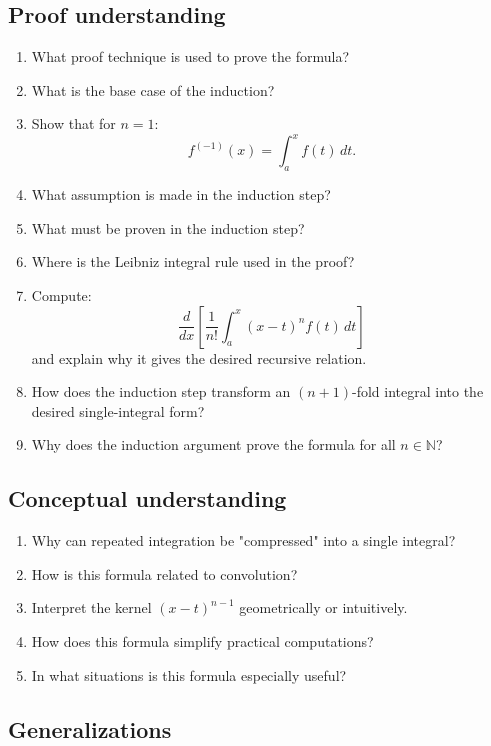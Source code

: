 \subsection{Proof understanding}

\begin{enumerate}[resume]
  \item What proof technique is used to prove the formula?
  \item What is the base case of the induction?
  \item Show that for \(n=1\):
    \[ f^{(-1)}(x) = \int_{a}^{x} f(t)\,dt. \]
  \item What assumption is made in the induction step?
  \item What must be proven in the induction step?
  \item Where is the Leibniz integral rule used in the proof?
  \item Compute:
    \[ \frac{d}{dx}\left[ \frac{1}{n!}\int_{a}^{x} (x - t)^{n} f(t)\,dt \right] \]
    and explain why it gives the desired recursive relation.
  \item How does the induction step transform an \((n+1)\)-fold integral into the desired single-integral form?
  \item Why does the induction argument prove the formula for all \(n \in \mathbb{N}\)?
\end{enumerate}

\subsection{Conceptual understanding}

\begin{enumerate}[resume]
  \item Why can repeated integration be "compressed" into a single integral?
  \item How is this formula related to convolution?
  \item Interpret the kernel \((x - t)^{n-1}\) geometrically or intuitively.
  \item How does this formula simplify practical computations?
  \item In what situations is this formula especially useful?
\end{enumerate}

\subsection{Generalizations}

